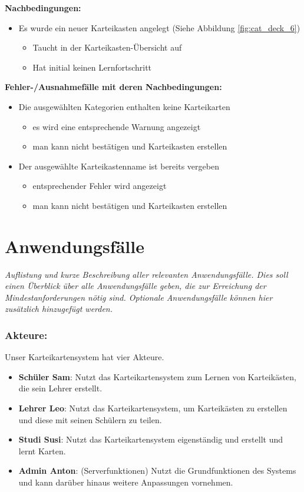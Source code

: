 \documentclass[fontsize=12pt,paper=a4,twoside]{scrartcl}
\begin{document}
\textbf{Nachbedingungen:}
\begin{itemize}
	\item Es wurde ein neuer Karteikasten angelegt (Siehe Abbildung \ref{fig:cat_deck_6})
	\begin{itemize}
		\item Taucht in der Karteikasten-Übersicht auf
		\item Hat initial keinen Lernfortschritt
	\end{itemize}
\end{itemize}
\textbf{Fehler-/Ausnahmefälle mit deren Nachbedingungen:}
\begin{itemize}
	\item Die ausgewählten Kategorien enthalten keine Karteikarten
	\begin{itemize}
		\item es wird eine entsprechende Warnung angezeigt
		\item man kann nicht bestätigen und Karteikasten erstellen
	\end{itemize}
	\item Der ausgewählte Karteikastenname ist bereits vergeben
	\begin{itemize}
		\item entsprechender Fehler wird angezeigt
		\item man kann nicht bestätigen und Karteikasten erstellen
	\end{itemize}
\end{itemize}

\section{Anwendungsfälle}

{ \em Auflistung und kurze Beschreibung aller relevanten
	Anwendungsfälle. Dies soll einen Überblick über alle Anwendungsfälle
	geben, die zur Erreichung der Mindestanforderungen nötig sind. Optionale
	Anwendungsfälle können hier zusätzlich hinzugefügt werden.
}
\subsubsection{Akteure:}
Unser Karteikartensystem hat vier Akteure.
\begin{itemize}
	\item \textbf{Schüler Sam}: Nutzt das Karteikartensystem zum Lernen von Karteikästen, die sein Lehrer erstellt.
	\item \textbf{Lehrer Leo}: Nutzt das Karteikartensystem, um Karteikästen zu erstellen und diese mit seinen Schülern zu teilen.
	\item \textbf{Studi Susi}: Nutzt das Karteikartensystem eigenständig und erstellt und lernt Karten.
	\item \textbf{Admin Anton}: (Serverfunktionen) Nutzt die Grundfunktionen des Systems und kann darüber hinaus weitere Anpassungen vornehmen.
\end{itemize}
\end{document}

